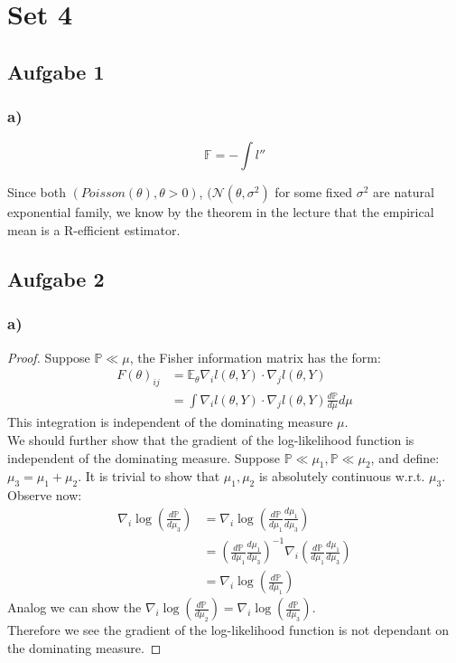 \documentclass[a4paper,11pt]{article}
\theoremstyle{definition}
\theoremstyle{remark}
\begin{document}

\section*{Set 4}
\subsection*{Aufgabe 1}
\subsubsection*{a)}

\begin{equation*}
	\mathbb{F} = - \int l''
\end{equation*}

Since both $(Poisson(\theta), \theta > 0)$,  $(\mathcal{N}(\theta, \sigma^2)$ for some fixed $\sigma^2$ are natural exponential family, we know by the theorem in the lecture that the empirical mean is a R-efficient estimator.\\


\subsection*{Aufgabe 2}
\subsubsection*{a)}
\begin{proof}
	Suppose $\mathbb{P} \ll \mu$, the Fisher information matrix has the form:
	\begin{align*}
		F(\theta)_{ij} &= \mathbb{E}_\theta \nabla_i l(\theta, Y) \cdot \nabla_j l(\theta, Y)\\
		&= \int \nabla_i l(\theta, Y) \cdot \nabla_j l(\theta, Y) \frac{d\mathbb{P}}{d\mu} d\mu
	\end{align*}
	This integration is independent of the dominating measure $\mu$.\\
	We should further show that the gradient of the log-likelihood function is independent of the
dominating measure. Suppose $\mathbb{P} \ll \mu_1, \mathbb{P} \ll \mu_2$, and define:$\mu_3 = \mu_1 + \mu_2$. It is trivial to show that $\mu_1, \mu_2$ is absolutely continuous w.r.t. $\mu_3$. Observe now:
\begin{align*}
	\nabla_i \log(\frac{d\mathbb{P}}{d\mu_3}) &= \nabla_i \log(\frac{d \mathbb{P}}{d \mu_1} \frac{d\mu_1}{d\mu_3}) \\
	&= (\frac{d\mathbb{P}}{d\mu_1} \frac{d\mu_1}{d\mu_3})^{-1} \nabla_i(  \frac{d\mathbb{P}}{d\mu_1}\frac{d\mu_1}{d\mu_3})\\
	&= \nabla_i \log(\frac{d\mathbb{P}}{d\mu_1})
\end{align*}
Analog we can show the $\nabla_i \log (\frac{d\mathbb{P}}{d\mu_2}) = \nabla_i \log (\frac{d\mathbb{P}}{d\mu_3})$.\\
Therefore we see the gradient of the log-likelihood function is not dependant on the dominating measure. 
\end{proof}
\end{document}
